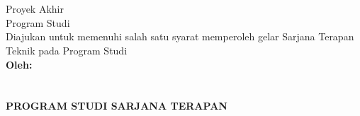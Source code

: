 \begin{titlepage}
    \begin{center}

        \begin{doublespace}
            \textbf{\MakeUppercase{\large{\tipe}}}\\[0.5cm]\textbf{\MakeUppercase{\normalsize{\judulid}}}\\[3cm]
            
        \end{doublespace}
        Proyek Akhir\\
        Program Studi {\prodi} \\[2cm]
        Diajukan untuk memenuhi salah satu syarat memperoleh gelar Sarjana Terapan Teknik pada Program Studi {\prodi} {\departemen} {\fakultas} {\universitas}\\[3cm]
        

        \textbf{\normalsize {Oleh:}} \\
        \textbf{\normalsize \MakeUppercase{\underline{\penulis}}} \\
        \textbf{\normalsize \MakeUppercase{{\nim}}} \\[4cm]


        \textbf{\normalsize \MakeUppercase{Program Studi Sarjana Terapan\\ \prodi}}\\
        \textbf{\normalsize \MakeUppercase{\departemen}}\\
        \textbf{\normalsize \MakeUppercase{\fakultas}}\\
        \textbf{\normalsize \MakeUppercase{\universitas}}\\
        \textbf{\normalsize \the\year{}}\\
    \end{center}
\end{titlepage}